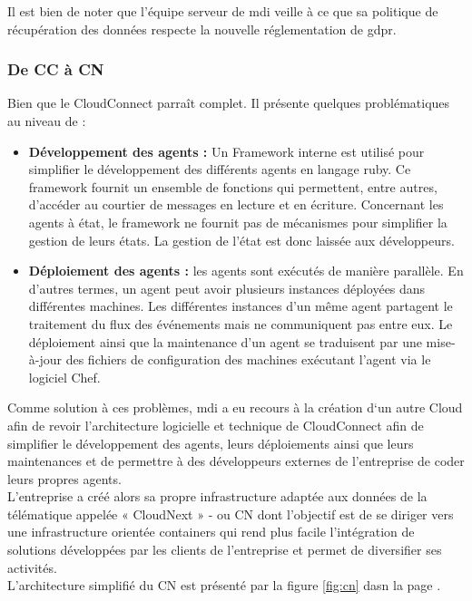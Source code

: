         Il est bien de noter que l'équipe serveur de \gls{mdi} veille à ce que sa politique de récupération des données 
        respecte la nouvelle réglementation de \gls{gdpr}\cite{gdpr}. \\ [0.3cm]
      
    
    \subsubsection{De \gls{CC} à \gls{CN}}

       Bien que le CloudConnect parraît complet. Il présente quelques problématiques au niveau de : 
       \begin{itemize}
        \renewcommand{\labelitemi}{$\bullet$}
            \item \textbf{Développement des agents :} Un Framework interne est utilisé pour simplifier le développement des différents 
        agents en langage ruby. Ce framework fournit un ensemble de fonctions qui permettent, entre autres, d’accéder au 
        courtier de messages en lecture et en écriture. Concernant les agents à état, le framework ne fournit pas 
        de mécanismes pour simplifier la gestion de leurs états. La gestion de l’état est donc laissée aux développeurs.\\[0.3cm]
            \item \textbf{Déploiement des agents :} les agents sont exécutés de manière parallèle. En d’autres termes, un agent peut avoir 
        plusieurs instances déployées dans différentes machines. Les différentes instances d’un même agent partagent 
        le traitement du flux des événements mais ne communiquent pas entre eux. Le déploiement ainsi que la maintenance 
        d’un agent se traduisent par une mise-à-jour des fichiers de configuration des machines exécutant l’agent via le logiciel Chef.\\ [0.3cm]
    \end{itemize}

         Comme solution à ces problèmes, \gls{mdi} a eu recours à la création d‘un autre Cloud afin de revoir l’architecture 
        logicielle et technique de CloudConnect afin de simplifier le développement des agents, leurs déploiements 
        ainsi que leurs maintenances et de permettre à des développeurs externes de l’entreprise de coder leurs propres agents.\\
        L'entreprise a créé alors sa propre infrastructure adaptée aux données de la télématique appelée « CloudNext » - ou  \gls{CN} 
        dont l’objectif est de se diriger vers une infrastructure orientée containers qui rend plus facile l’intégration de 
        solutions développées par les clients de l’entreprise et permet de diversifier ses activités.\\ [0.3cm] 
        L'architecture simplifié du \gls{CN} est présenté par la figure \ref{fig:cn} dasn la page \pageref{fig:cn}.


